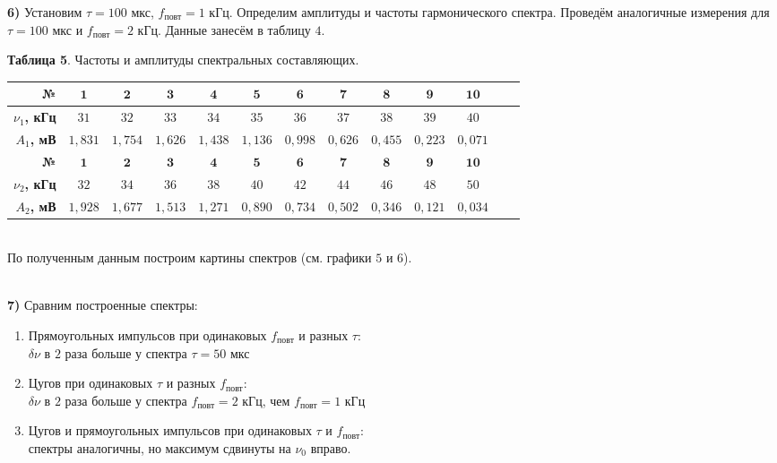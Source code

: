 \documentclass[11pt,a4paper]{article}
\begin{document}
\newpage

\textbf{6)} Установим $\tau = 100$ мкс, $f_{\text{повт}} = 1$ кГц. Определим амплитуды и частоты гармонического спектра. Проведём аналогичные измерения для $\tau = 100$ мкс и $f_{\text{повт}} = 2$ кГц. Данные занесём в таблицу $4$.
	\begin{table} [h!]
	\centering
	\textbf{Таблица 5}. Частоты и амплитуды спектральных составляющих.
	\begin{tabular}{|r||c|c|c|c|c|c|c|c|c|c|c|c|}
		\hline 
		\textbf{№} & $\textbf{1}$ & $\textbf{2}$ & $\textbf{3}$ & $\textbf{4}$ & $\textbf{5}$ & $\textbf{6}$ & $\textbf{7}$ & $\textbf{8}$ & $\textbf{9}$ & $\textbf{10}$\\ 
		\hline
		\textbf {$\nu_1$, кГц} & $31$ & $32$ & $33$ & $34$ & $35$ & $36$ & $37$ & $38$ & $39$ & $ 40$ \\ 
		\hline
		\textbf {$A_1$, мВ} & $1,831$ & $1,754$ & $1,626$ & $1,438$ & $1,136$ & $0,998$ & $0,626$ & $0,455$ & $0,223$ & $0,071$ \\ 
		\hline
		\hline
		\textbf{№} & $\textbf{1}$ & $\textbf{2}$ & $\textbf{3}$ & $\textbf{4}$ & $\textbf{5}$ & $\textbf{6}$ & $\textbf{7}$ & $\textbf{8}$ & $\textbf{9}$ & $\textbf{10}$ \\ 
		\hline
		\textbf {$\nu_2$, кГц} & $32$ & $34$ & $36$ & $38$ & $40$ & $42$ & $44$ & $46$ & $48$ & $50$ \\ 
		\hline
		\textbf {$A_2$, мВ} & $1,928$ & $1,677$ & $1,513$ & $1,271$ & $0,890$ & $0,734$ & $0,502$ & $0,346$ & $0,121$ & $0,034$ \\ 
		\hline
	\end{tabular}
\end{table}
\\
По полученным данным построим картины спектров (см. графики $5$ и $6$).\\\


\textbf{7)} Сравним построенные спектры:
\begin{enumerate}
	\item Прямоугольных импульсов при одинаковых $f_{\text{повт}}$ и разных $\tau$:\\
	$\delta \nu$ в $2$ раза больше у спектра $\tau = 50$ мкс
	\item Цугов при одинаковых $\tau$ и разных $f_{\text{повт}}$:\\
	$\delta \nu$ в $2$ раза больше у спектра $f_{\text{повт}} = 2$ кГц, чем $f_{\text{повт}} = 1$ кГц
	\item Цугов и прямоугольных импульсов при одинаковых $\tau$ и $f_{\text{повт}}$:\\
	спектры аналогичны, но максимум сдвинуты на $\nu_0$ вправо.	
\end{enumerate}
\end{document}

